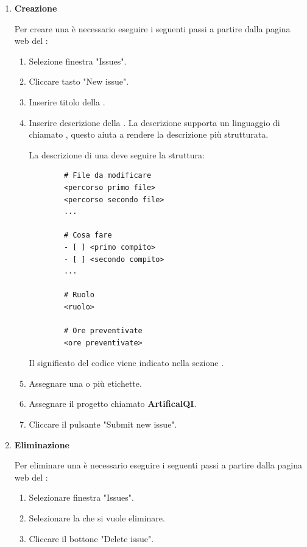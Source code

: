 \begin{enumerate}
    \item \textbf{Creazione}
    \label{item:creazione_issue}
    
    Per creare una  è necessario eseguire i seguenti passi a partire dalla pagina web del :
    \begin{enumerate}
        \item Selezione finestra "Issues".
        \item Cliccare tasto "New issue".
        \item Inserire titolo della .
        \item Inserire descrizione della .
        La descrizione supporta un linguaggio di  chiamato , questo aiuta a rendere la descrizione più strutturata.

        La descrizione di una  deve seguire la struttura:
        \begin{lstlisting}
        # File da modificare
        <percorso primo file>
        <percorso secondo file>
        ...

        # Cosa fare
        - [ ] <primo compito>
        - [ ] <secondo compito>
        ...

        # Ruolo
        <ruolo>

        # Ore preventivate
        <ore preventivate>
        \end{lstlisting}
        Il significato del codice viene indicato nella sezione \hyperref[subpar:markdown]{}.

        \item Assegnare una o più etichette.
        \item Assegnare il progetto chiamato \textbf{ArtificalQI}.
        \item Cliccare il pulsante "Submit new issue".
    \end{enumerate}
    
    \item \textbf{Eliminazione}
    
    Per eliminare una  è necessario eseguire i seguenti passi a partire dalla pagina web del :
    \begin{enumerate}
        \item Selezionare finestra "Issues".
        \item Selezionare la  che si vuole eliminare.
        \item Cliccare il bottone "Delete issue".
    \end{enumerate}


\end{enumerate}
